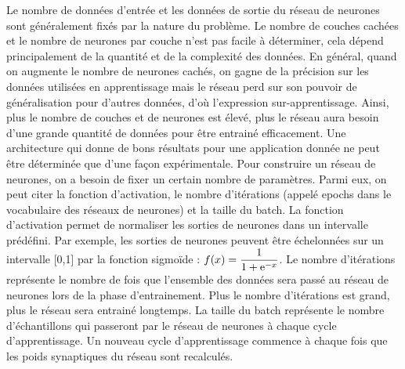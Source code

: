 Le nombre de données d'entrée et les données de sortie du réseau de neurones sont généralement fixés par la nature du problème. 
Le nombre de couches cachées et le nombre de neurones par couche n'est pas facile à déterminer, cela dépend principalement de la quantité et de la complexité des données. En général, quand on augmente le nombre de neurones cachés, on gagne de la
précision sur les données utilisées en apprentissage mais le réseau perd sur son pouvoir de généralisation pour d'autres données, d'où l'expression sur-apprentissage. Ainsi, plus le nombre de couches et de neurones est élevé, plus le réseau aura besoin d'une grande quantité de données pour être entrainé efficacement. Une architecture qui donne de bons résultats pour une application donnée ne peut être déterminée que d'une façon expérimentale. Pour construire un réseau de neurones, on a besoin de fixer un certain nombre de paramètres. Parmi eux, on peut citer la fonction d'activation, le nombre d'itérations (appelé epochs dans le vocabulaire des réseaux de neurones) et la taille du batch.
La fonction d'activation permet de normaliser les sorties de neurones dans un intervalle prédéfini. Par exemple, les sorties de neurones peuvent être échelonnées sur un intervalle [0,1] par la fonction sigmoïde : ${\displaystyle f(x)={\frac {1}{1+{\rm {e}}^{-x}}}}$.
 Le nombre d'itérations représente le nombre de fois que l'ensemble des données sera passé au réseau de neurones lors de la phase d'entrainement. Plus le nombre d'itérations est grand, plus le réseau sera entrainé longtemps. %
  La taille du batch représente le nombre d'échantillons qui passeront par le réseau de neurones à chaque cycle d'apprentissage. Un nouveau cycle d'apprentissage commence à chaque fois que les poids synaptiques du réseau sont recalculés.

